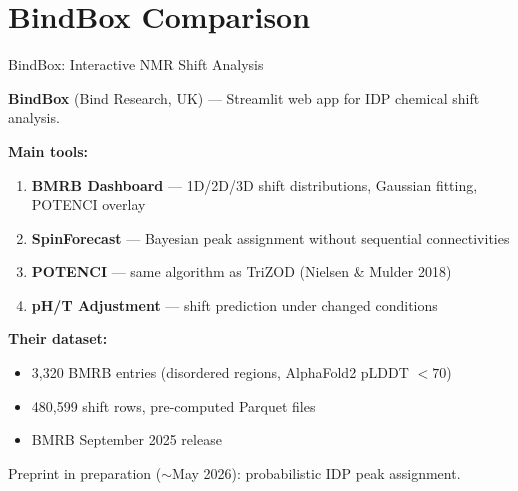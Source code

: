 \documentclass[aspectratio=169,11pt]{beamer}
\begin{document}
\section{BindBox Comparison}

\begin{frame}[shrink=10]{BindBox: Interactive NMR Shift Analysis}

\textbf{BindBox} (Bind Research, UK) --- Streamlit web app for IDP chemical shift analysis.

\medskip
\textbf{Main tools:}
\begin{enumerate}\setlength\itemsep{2pt}
  \item \textbf{BMRB Dashboard} --- 1D/2D/3D shift distributions, Gaussian fitting, POTENCI overlay
  \item \textbf{SpinForecast} --- Bayesian peak assignment without sequential connectivities
  \item \textbf{POTENCI} --- same algorithm as TriZOD (Nielsen \& Mulder 2018)
  \item \textbf{pH/T Adjustment} --- shift prediction under changed conditions
\end{enumerate}

\medskip
\textbf{Their dataset:}
\begin{itemize}
  \item 3,320 BMRB entries (disordered regions, AlphaFold2 pLDDT $< 70$)
  \item 480,599 shift rows, pre-computed Parquet files
  \item BMRB September 2025 release
\end{itemize}

\medskip
\footnotesize
Preprint in preparation ($\sim$May 2026): probabilistic IDP peak assignment.
\end{frame}
\end{document}
